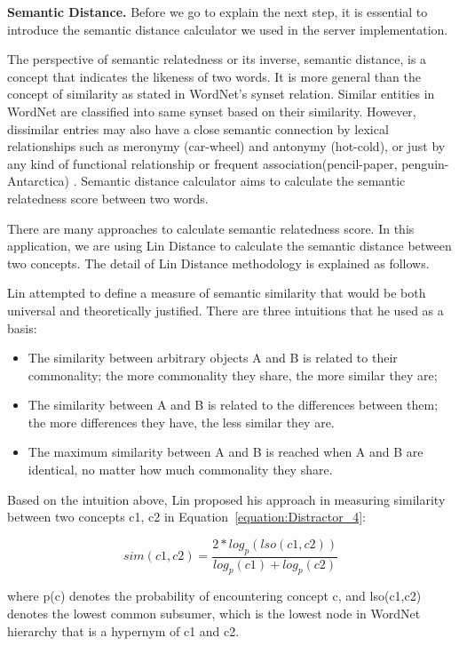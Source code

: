 {\bf Semantic Distance.}
Before we go to explain the next step, it is essential to introduce the semantic distance calculator we used in the server implementation. 

The perspective of semantic relatedness or its inverse, semantic distance, is a concept that indicates the likeness of two words. It is more general than the concept of similarity as stated in WordNet’s synset relation. Similar entities in WordNet are classified into same synset based on their similarity. However, dissimilar entries may also have a close semantic connection by lexical relationships  such as meronymy (car-wheel) and antonymy (hot-cold), or just by any kind of functional relationship or frequent association(pencil-paper, penguin-Antarctica) \cite{ale01}. Semantic distance calculator aims to calculate the semantic relatedness score between two words.

There are many approaches to calculate semantic relatedness score. In this application, we are using Lin Distance \cite{lin98} to calculate the semantic distance between two concepts. The detail of Lin Distance methodology is explained as follows.

Lin attempted to define a measure of semantic similarity that would be both universal and theoretically justified. There are three intuitions that he used as a basis:
\begin{itemize}
\item The similarity between arbitrary objects A and B is related to their commonality; the more commonality they share, the more similar they are;
\item The similarity between A and B is related to the differences between them; the more differences they have, the less similar they are.
\item The maximum similarity between A and B is reached when A and B are identical, no matter how much commonality they share. 
\end{itemize}

Based on the intuition above, Lin proposed his approach in measuring similarity between two concepts c1, c2 in Equation~\ref{equation:Distractor_4}:

\begin{equation}
sim(c1,c2) = \frac{2*log_p(lso(c1,c2))}{log_p(c1)+log_p(c2)}
\label{equation:Distractor_4}
\end{equation}  

where p(c) denotes the probability of encountering concept c, and lso(c1,c2) denotes the lowest common subsumer, which is the lowest node in WordNet hierarchy that is a hypernym of c1 and c2. 

